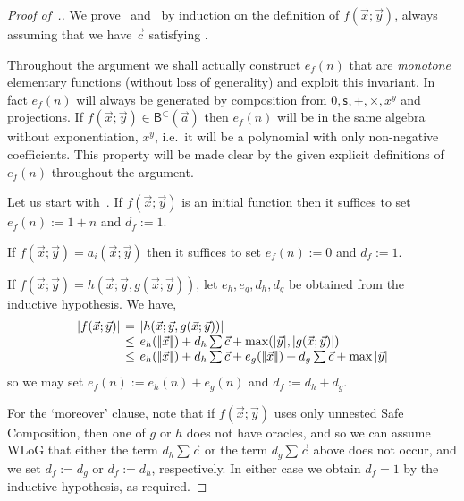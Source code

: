 \documentclass[manuscript,screen]{acmart}
\newcommand{\dfn}{:=}
\theoremstyle{definition}
\theoremstyle{remark}
\newcommand{\permpref}{\subset}
\renewcommand{\succ}[1]{\mathsf{s}_{#1}}
\newcommand{\sumlen}[1]{|\hspace{-.15em}|#1|\hspace{-.15em}|}
\newcommand{\bc}{\mathsf{B}}
\newcommand{\bcwfpo}[1]{\bc^{#1}}
\newcommand{\bcpp}{\bcwfpo{\permpref}}
\begin{document}
\begin{proof}[Proof of~.]
\label{prf:boundinglemma}
We prove~ and~ by induction on the definition of $f(\vec x;\vec y)$, always assuming that we have $\vec c$ satisfying .

Throughout the argument we shall actually construct $e_f( n)$ that are \emph{monotone} elementary functions (without loss of generality) and exploit this invariant.
In fact $e_f( n)$ will always be generated by composition from $0, \succ{}, +, \times,  x^y$ and projections.
If $f(\vec x;\vec y) \in \bcpp(\vec a)$ then $e_f(n)$ will be in the same algebra without exponentiation, $ x^y$, i.e.\ it will be a polynomial with only non-negative coefficients.
This property will be made clear by the given explicit definitions of $e_f( n)$ throughout the argument.


Let us start with~. If $f(\vec x;\vec y)$ is an initial function then it suffices to set $e_f(n) \dfn 1 +  n$ and $d_f\dfn 1$.

If $f(\vec x;\vec y) = a_i(\vec x;\vec y)$ then it suffices to set $e_f(n) \dfn 0 $ and $d_f \dfn 1$.

If $f(\vec x;\vec y) = h(\vec x;\vec y, g(\vec x;\vec y))$, let $e_h, e_g, d_h, d_g$ be obtained from the inductive hypothesis.
We have,
\[
\arraycolsep=2pt
\begin{array}{rcl}
    |f(\vec x;\vec y)| & = & |h(\vec x; \vec y, g(\vec x; \vec y))| \\
    & \leq & e_h(\sumlen{\vec x}) + d_h\sum\vec c + \max(|\vec y|, |g(\vec x;\vec y)|) \\
    & \leq & e_h(\sumlen{\vec x}) + d_h\sum\vec c + e_g(\sumlen{\vec x}) + d_g\sum \vec c + \max|\vec y|
\end{array}
\]
so we may set $e_f(n) \dfn e_h(n) + e_g(n)$ and $d_f\dfn d_h+d_g$.

For the `moreover' clause, note that if $f(\vec x;\vec y)$ uses only unnested Safe Composition, then one of $g$ or $h$ does not have oracles, and so we can assume WLoG that either the term $d_h\sum \vec c$ or the term $d_g\sum \vec c$ above does not occur, and we set $d_f \dfn d_g$ or $d_f\dfn d_h$, respectively. In either case we obtain $d_f=1$ by the inductive hypothesis, as required.


\end{proof}
\end{document}
